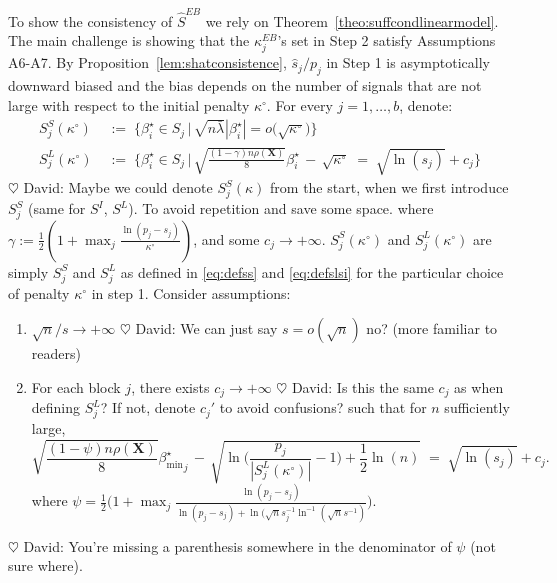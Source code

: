 \documentclass[aos]{imsart}
\theoremstyle{plain}
\newcommand{\david}[1]{{\small{\color{blue} \sf $\heartsuit$ David: #1}}}
\newcommand{\bs}{\boldsymbol}
\begin{document}
To show the consistency of $\hat{S}^{EB}$ we rely on Theorem~\ref{theo:suffcondlinearmodel}. The main challenge is showing that the $\kappa_j^{EB}$'s set in Step 2 satisfy Assumptions A6-A7. By Proposition~\ref{lem:shatconsistence}, $\widehat{s}_j/p_j$ in Step 1 is asymptotically downward biased and the bias depends on the number of signals that are not large with respect to the initial penalty $\kappa^{\circ}$. For every $j=1,\ldots,b$, denote:
\begin{align*}
    S_j^{S}(\kappa^{\circ})\;&:=\;\Bigg\{\beta_i^{\star} \in S_j \,\Big|\,\sqrt{n\bar{\lambda}}|\beta_{i}^{\star}|=o\big(\sqrt{\kappa^{\circ}}\big) \Bigg\} \\
    S_j^{L}(\kappa^{\circ})\;&:=\;\Bigg\{\beta_i^{\star} \in S_j \,\Big|\,\sqrt{\frac{(1-\gamma)n\rho(\bs X)}{8}}{\beta_{i}^{\star}} \,- \,\sqrt{\kappa^{\circ}} \;=\; \sqrt{\ln(s_j)} + c_{j}\Bigg\}
\end{align*}
\david{Maybe we could denote $S_j^S(\kappa)$ from the start, when we first introduce $S_j^S$ (same for $S^I$, $S^L$). To avoid repetition and save some space.}
where $\gamma:=\frac12(1+\max_j \frac{\ln(p_j-s_j)}{\kappa^{\circ}})$, and
some $c_j\to+\infty$. $S_j^{S}(\kappa^{\circ})$ and $S_j^{L}(\kappa^{\circ})$ are simply $S_j^{S}$ and $S_j^{L}$ as defined in \eqref{eq:defss} and \eqref{eq:defslsi} for the particular choice of penalty $\kappa^{\circ}$ in step 1. Consider assumptions:
\begin{enumerate}[start=8,label={(A\arabic*)}]
    \item $\sqrt{n}/s \to +\infty$  \david{We can just say $s=o(\sqrt{n})$ no? (more familiar to readers)}\\
\item For each block $j$, there exists $c_{j}\to +\infty$ \david{Is this the same $c_j$ as when defining $S_j^L$? If not, denote $c_j'$ to avoid confusions?} such that for $n$ sufficiently large, %
    \begin{equation*}\label{cond:suffIIreg2}
        \sqrt{\frac{ (1-\psi)n\rho(\bs X)}{8}}{{\beta_{\min}^{\star}}_j} \,- \,\sqrt{\ln\big(\frac{p_j}{|S^L_j(\kappa^{\circ})|}-1\big)+\frac12\ln(n)} \;=\; \sqrt{\ln(s_j)} + c_{j} .
    \end{equation*}
where $\psi=\frac12\big(1+\max_j \frac{\ln(p_j-s_j)}{\ln(p_j-s_j)+\ln(\sqrt{n}s_j^{-1}\ln^{-1}(\sqrt{n}s^{-1})}\big)$.
\end{enumerate}
\david{You're missing a parenthesis somewhere in the denominator of $\psi$ (not sure where).}
\end{document}
